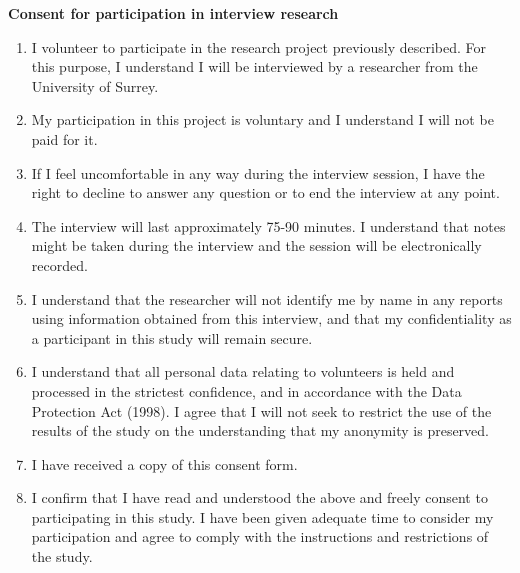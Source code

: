\newpage
\hrulefill\par

\begin{center}
\textbf{Consent for participation in interview research}
\end{center}

\begin{enumerate}
	\item I volunteer to participate in the research project previously described. For this purpose, I understand I will be interviewed by a researcher from the University of Surrey. 
	\item My participation in this project is voluntary and I understand I will not be paid for it.
	\item If I feel uncomfortable in any way during the interview session, I have the right to decline to answer any question or to end the interview at any point. 
	\item The interview will last approximately 75-90 minutes. I understand that notes might be taken during the interview and the session will be electronically recorded.
	\item I understand that the researcher will not identify me by name in any reports using information obtained from this interview, and that my confidentiality as a participant in this study will remain secure.
	\item I understand that all personal data relating to volunteers is held and processed in the strictest confidence, and in accordance with the Data Protection Act (1998). I agree that I will not seek to restrict the use of the results of the study on the understanding that my anonymity is preserved.
	\item I have received a copy of this consent form.
	\item I confirm that I have read and understood the above and freely consent to participating in this study. I have been given adequate time to consider my participation and agree to comply with the instructions and restrictions of the study.
\end{enumerate}


\vspace{.6in}
\vspace{.6in}
